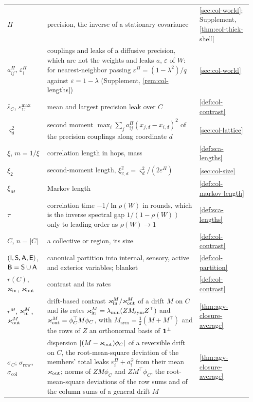 \begin{longtable}{@{}>{\raggedright\arraybackslash}p{}>{\raggedright\arraybackslash}p{}>{\raggedright\arraybackslash}p{}@{}}
$\Pi$ & precision, the inverse of a stationary covariance & \cref{sec:col-world}; Supplement, \cref{thm:col-thick-shell}\\
$a^\Pi_{ij}$, $\varepsilon^\Pi_i$ & couplings and leaks of a diffusive precision, which are not the weights and leaks $a$, $\varepsilon$ of $W$: for nearest-neighbor passing $\varepsilon^\Pi=(1-\lambda^2)/q$ against $\varepsilon=1-\lambda$ (Supplement, \cref{rem:col-lengths}) & \cref{sec:col-world}\\
$\bar\varepsilon_C$, $\varepsilon^{\max}_C$ & mean and largest precision leak over $C$ & \cref{def:col-contrast}\\
$\varsigma_d^2$ & second moment $\max_i\sum_ja^\Pi_{ij}(x_{j,d}-x_{i,d})^2$ of the precision couplings along coordinate $d$ & \cref{sec:col-lattice}\\
$\xi$, $m=1/\xi$ & correlation length in hops, mass & \cref{def:sca-lengths}\\
$\xi_2$ & second-moment length, $\xi_{2,d}^2=\varsigma_d^2/(2\varepsilon^\Pi)$ & \cref{sec:col-size}\\
$\xi_M$ & Markov length & \cref{def:col-markov-length}\\
$\tau$ & correlation time $-1/\ln\rho(W)$ in rounds, which is the inverse spectral gap $1/(1-\rho(W))$ only to leading order as $\rho(W)\to1$ & \cref{def:sca-lengths}\\
$C$, $n=\lvert C\rvert$ & a collective or region, its size & \cref{def:col-contrast}\\
$(\mathsf{I},\mathsf{S},\mathsf{A},\mathsf{E})$, $\mathsf{B}=\mathsf{S}\cup\mathsf{A}$ & canonical partition into internal, sensory, active and exterior variables; blanket & \cref{def:col-partition}\\
$r(C)$, $\varkappa_{\mathrm{in}}$, $\varkappa_{\mathrm{out}}$ & contrast and its rates & \cref{def:col-contrast}\\
$r^M$, $\varkappa_{\mathrm{in}}^M$, $\varkappa_{\mathrm{out}}^M$ & drift-based contrast $\varkappa_{\mathrm{in}}^M/\varkappa_{\mathrm{out}}^M$ of a drift $M$ on $C$ and its rates $\varkappa_{\mathrm{in}}^M=\lambda_{\min}(ZM_{\mathrm{sym}}Z^\top)$ and $\varkappa_{\mathrm{out}}^M=\phi_C^\top M\phi_C$, with $M_{\mathrm{sym}}=\frac12(M+M^\top)$ and the rows of $Z$ an orthonormal basis of $\mathbf{1}^\perp$ & \cref{thm:agy-closure-average}\\
$\sigma_C$; $\sigma_{\mathrm{row}}$, $\sigma_{\mathrm{col}}$ & dispersion $\lvert(M-\varkappa_{\mathrm{out}})\phi_C\rvert$ of a reversible drift on $C$, the root-mean-square deviation of the members' total leaks $\varepsilon^\Pi_i+a^\partial_i$ from their mean $\varkappa_{\mathrm{out}}$; norms of $ZM\phi_C$ and $ZM^\top\phi_C$, the root-mean-square deviations of the row sums and of the column sums of a general drift $M$ & \cref{thm:agy-closure-average}\\

\end{longtable}
